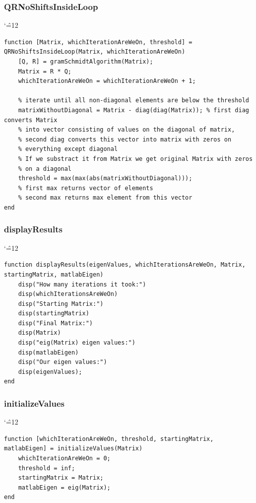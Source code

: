 \documentclass[12pt]{report}
\newenvironment{simplechar}{%
   \catcode`\^=12
}{}
\begin{document}
\subsubsection{QRNoShiftsInsideLoop}
\begin{simplechar}
\begin{lstlisting}
function [Matrix, whichIterationAreWeOn, threshold] = QRNoShiftsInsideLoop(Matrix, whichIterationAreWeOn)
    [Q, R] = gramSchmidtAlgorithm(Matrix);
    Matrix = R * Q;
    whichIterationAreWeOn = whichIterationAreWeOn + 1;

    % iterate until all non-diagonal elements are below the threshold
    matrixWithoutDiagonal = Matrix - diag(diag(Matrix)); % first diag converts Matrix
    % into vector consisting of values on the diagonal of matrix,
    % second diag converts this vector into matrix with zeros on
    % everything except diagonal
    % If we substract it from Matrix we get original Matrix with zeros
    % on a diagonal
    threshold = max(max(abs(matrixWithoutDiagonal)));
    % first max returns vector of elements
    % second max returns max element from this vector
end
\end{lstlisting}
\end{simplechar}

\newpage
\subsubsection{displayResults}
\begin{simplechar}
\begin{lstlisting}
function displayResults(eigenValues, whichIterationsAreWeOn, Matrix, startingMatrix, matlabEigen)
    disp("How many iterations it took:")
    disp(whichIterationsAreWeOn)
    disp("Starting Matrix:")
    disp(startingMatrix)
    disp("Final Matrix:")
    disp(Matrix)
    disp("eig(Matrix) eigen values:")
    disp(matlabEigen)
    disp("Our eigen values:")
    disp(eigenValues);
end
\end{lstlisting}
\end{simplechar}

\subsubsection{initializeValues}
\begin{simplechar}
\begin{lstlisting}
function [whichIterationAreWeOn, threshold, startingMatrix, matlabEigen] = initializeValues(Matrix)
    whichIterationAreWeOn = 0;
    threshold = inf;
    startingMatrix = Matrix;
    matlabEigen = eig(Matrix);
end
\end{lstlisting}
\end{simplechar}
\end{document}
